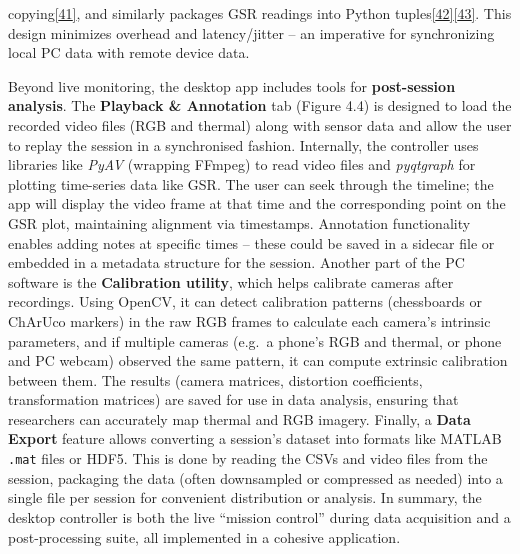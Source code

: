 \documentclass[12pt,a4paper]{article}
\begin{document}
copying\href{https://github.com/buccancs/GSR-Dual-Video-System/blob/05ae360cb7b4ae7c7861f72deb235ad64a74b38e/pc_controller/src/cpp_backend/native_backend.cpp\#L66-L74}{{[}41{]}}, and similarly packages GSR readings into Python tuples\href{https://github.com/buccancs/GSR-Dual-Video-System/blob/05ae360cb7b4ae7c7861f72deb235ad64a74b38e/pc_controller/src/cpp_backend/native_backend.cpp\#L193-L201}{{[}42{]}}\href{https://github.com/buccancs/GSR-Dual-Video-System/blob/05ae360cb7b4ae7c7861f72deb235ad64a74b38e/pc_controller/src/cpp_backend/native_backend.cpp\#L200-L208}{{[}43{]}}. This design minimizes overhead and latency/jitter -- an imperative for synchronizing local PC data with remote device data.

Beyond live monitoring, the desktop app includes tools for \textbf{post-session analysis}. The \textbf{Playback \& Annotation} tab (Figure 4.4) is designed to load the recorded video files (RGB and thermal) along with sensor data and allow the user to replay the session in a synchronised fashion. Internally, the controller uses libraries like \emph{PyAV} (wrapping FFmpeg) to read video files and \emph{pyqtgraph} for plotting time-series data like GSR. The user can seek through the timeline; the app will display the video frame at that time and the corresponding point on the GSR plot, maintaining alignment via timestamps. Annotation functionality enables adding notes at specific times -- these could be saved in a sidecar file or embedded in a metadata structure for the session. Another part of the PC software is the \textbf{Calibration utility}, which helps calibrate cameras after recordings. Using OpenCV, it can detect calibration patterns (chessboards or ChArUco markers) in the raw RGB frames to calculate each camera's intrinsic parameters, and if multiple cameras (e.g.~a phone's RGB and thermal, or phone and PC webcam) observed the same pattern, it can compute extrinsic calibration between them. The results (camera matrices, distortion coefficients, transformation matrices) are saved for use in data analysis, ensuring that researchers can accurately map thermal and RGB imagery. Finally, a \textbf{Data Export} feature allows converting a session's dataset into formats like MATLAB \passthrough{\lstinline!.mat!} files or HDF5. This is done by reading the CSVs and video files from the session, packaging the data (often downsampled or compressed as needed) into a single file per session for convenient distribution or analysis. In summary, the desktop controller is both the live ``mission control'' during data acquisition and a post-processing suite, all implemented in a cohesive application.
\end{document}
